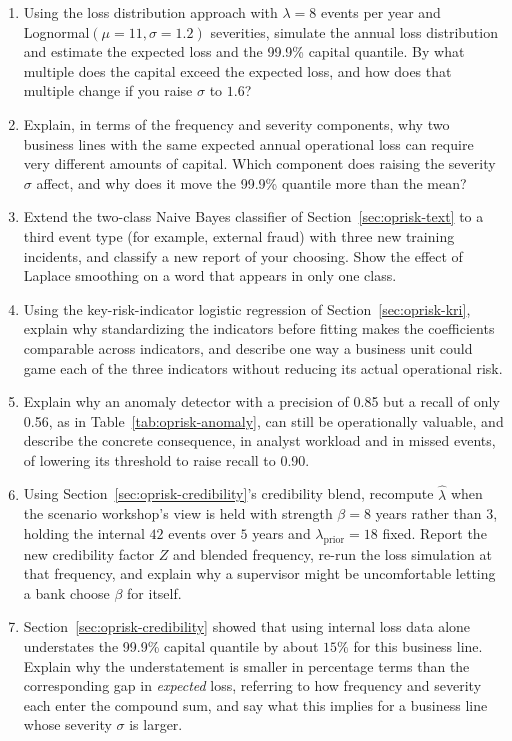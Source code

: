 \documentclass[../ai_in_finance]{subfiles}
\begin{document}
\begin{enumerate}
\item Using the loss distribution approach with $\lambda = 8$ events per year and Lognormal$(\mu=11, \sigma=1.2)$ severities, simulate the annual loss distribution and estimate the expected loss and the 99.9\% capital quantile. By what multiple does the capital exceed the expected loss, and how does that multiple change if you raise $\sigma$ to $1.6$?
\item Explain, in terms of the frequency and severity components, why two business lines with the same expected annual operational loss can require very different amounts of capital. Which component does raising the severity $\sigma$ affect, and why does it move the 99.9\% quantile more than the mean?
\item Extend the two-class Naive Bayes classifier of Section~\ref{sec:oprisk-text} to a third event type (for example, external fraud) with three new training incidents, and classify a new report of your choosing. Show the effect of Laplace smoothing on a word that appears in only one class.
\item Using the key-risk-indicator logistic regression of Section~\ref{sec:oprisk-kri}, explain why standardizing the indicators before fitting makes the coefficients comparable across indicators, and describe one way a business unit could game each of the three indicators without reducing its actual operational risk.
\item Explain why an anomaly detector with a precision of 0.85 but a recall of only 0.56, as in Table~\ref{tab:oprisk-anomaly}, can still be operationally valuable, and describe the concrete consequence, in analyst workload and in missed events, of lowering its threshold to raise recall to 0.90.
\item Using Section~\ref{sec:oprisk-credibility}'s credibility blend, recompute $\hat\lambda$ when the scenario workshop's view is held with strength $\beta = 8$ years rather than $3$, holding the internal $42$ events over $5$ years and $\lambda_{\text{prior}}=18$ fixed. Report the new credibility factor $Z$ and blended frequency, re-run the loss simulation at that frequency, and explain why a supervisor might be uncomfortable letting a bank choose $\beta$ for itself.
\item Section~\ref{sec:oprisk-credibility} showed that using internal loss data alone understates the 99.9\% capital quantile by about $15\%$ for this business line. Explain why the understatement is smaller in percentage terms than the corresponding gap in \emph{expected} loss, referring to how frequency and severity each enter the compound sum, and say what this implies for a business line whose severity $\sigma$ is larger.

\end{enumerate}
\end{document}

